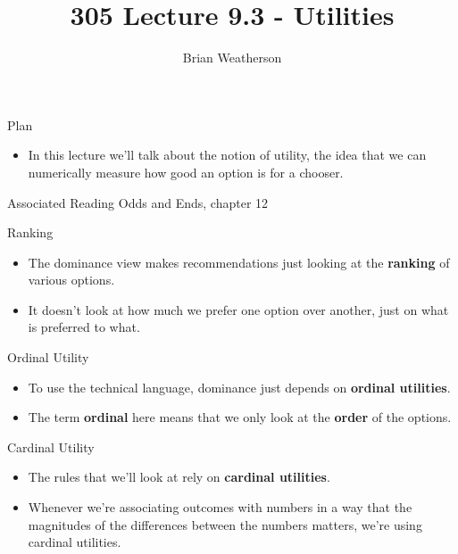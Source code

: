 \documentclass[
  ignorenonframetext,
]{beamer}
\title{305 Lecture 9.3 - Utilities}
\author{Brian Weatherson}
\date{}
\providecommand{\tightlist}{%
  \setlength{\itemsep}{0pt}\setlength{\parskip}{0pt}}
\renewcommand{\,}{\text{, }}
\begin{document}
\frame{\titlepage}

\begin{frame}{Plan}
\protect\hypertarget{plan}{}
\begin{itemize}
\tightlist
\item
  In this lecture we'll talk about the notion of utility, the idea that
  we can numerically measure how good an option is for a chooser.
\end{itemize}
\end{frame}

\begin{frame}{Associated Reading}
\protect\hypertarget{associated-reading}{}
Odds and Ends, chapter 12
\end{frame}

\begin{frame}{Ranking}
\protect\hypertarget{ranking}{}
\begin{itemize}
\tightlist
\item
  The dominance view makes recommendations just looking at the
  \textbf{ranking} of various options.
\item
  It doesn't look at how much we prefer one option over another, just on
  what is preferred to what.
\end{itemize}
\end{frame}

\begin{frame}{Ordinal Utility}
\protect\hypertarget{ordinal-utility}{}
\begin{itemize}
\tightlist
\item
  To use the technical language, dominance just depends on
  \textbf{ordinal utilities}.
\item
  The term \textbf{ordinal} here means that we only look at the
  \textbf{order} of the options.
\end{itemize}
\end{frame}

\begin{frame}{Cardinal Utility}
\protect\hypertarget{cardinal-utility}{}
\begin{itemize}
\tightlist
\item
  The rules that we'll look at rely on \textbf{cardinal utilities}.
\item
  Whenever we're associating outcomes with numbers in a way that the
  magnitudes of the differences between the numbers matters, we're using
  cardinal utilities.
\end{itemize}
\end{frame}
\end{document}
